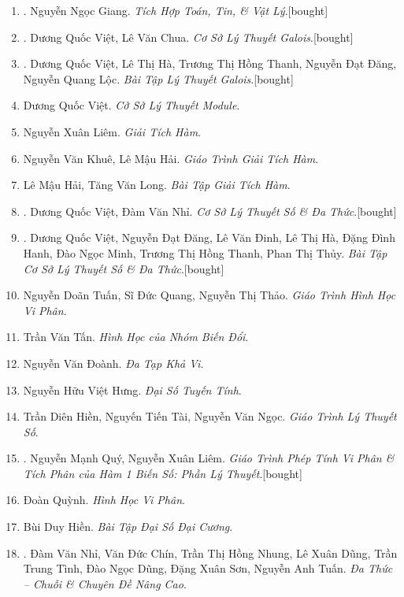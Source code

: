 \documentclass{article}
\begin{document}
\begin{enumerate}
	\item \cite{Giang2019}. Nguyễn Ngọc Giang. \textit{Tích Hợp Toán, Tin, \& Vật Lý}.\hfill\textsf{[bought]}
	\item \cite{Viet_Chua2022}. Dương Quốc Việt, Lê Văn Chua. \textit{Cơ Sở Lý Thuyết Galois}.\hfill\textsf{[bought]}
	\item \cite{Viet_Ha_Thanh_Dang_Loc2022}. Dương Quốc Việt, Lê Thị Hà, Trương Thị Hồng Thanh, Nguyễn Đạt Đăng, Nguyễn Quang Lộc. \textit{Bài Tập Lý Thuyết Galois}.\hfill\textsf{[bought]}
	\item Dương Quốc Việt. \textit{Cở Sở Lý Thuyết Module}.
	\item Nguyễn Xuân Liêm. \textit{Giải Tích Hàm}.
	\item Nguyễn Văn Khuê, Lê Mậu Hải. \textit{Giáo Trình Giải Tích Hàm}.
	\item Lê Mậu Hải, Tăng Văn Long. \textit{Bài Tập Giải Tích Hàm}.
	\item \cite{Viet_Nhi2022}. Dương Quốc Việt, Đàm Văn Nhỉ. \textit{Cơ Sở Lý Thuyết Số \& Đa Thức}.\hfill\textsf{[bought]}
	\item \cite{Viet_Dang_Dinh_Ha_Hanh_Minh_Thanh_Thuy2022}. Dương Quốc Việt, Nguyễn Đạt Đăng, Lê Văn Đinh, Lê Thị Hà, Đặng Đình Hanh, Đào Ngọc Minh, Trương Thị Hồng Thanh, Phan Thị Thủy. \textit{Bài Tập Cơ Sở Lý Thuyết Số \& Đa Thức}.\hfill\textsf{[bought]}
	\item Nguyễn Doãn Tuấn, Sĩ Đức Quang, Nguyễn Thị Thảo. \textit{Giáo Trình Hình Học Vi Phân}.
	\item Trần Văn Tấn. \textit{Hình Học của Nhóm Biến Đổi}.
	\item Nguyễn Văn Đoành. \textit{Đa Tạp Khả Vi}.
	\item Nguyễn Hữu Việt Hưng. \textit{Đại Số Tuyến Tính}.
	\item Trần Diên Hiền, Nguyến Tiến Tài, Nguyễn Văn Ngọc. \textit{Giáo Trình Lý Thuyết Số}.
	\item \cite{Quy_Liem2012}. Nguyễn Mạnh Quý, Nguyễn Xuân Liêm. \textit{Giáo Trình Phép Tính Vi Phân \& Tích Phân của Hàm 1 Biến Số: Phần Lý Thuyết}.\hfill\textsf{[bought]}
	\item Đoàn Quỳnh. \textit{Hình Học Vi Phân}.
	\item Bùi Duy Hiền. \textit{Bài Tập Đại Số Đại Cương}.
	\item \cite{Nhi_Chin_Dung_Dung_Tinh_Dung_Son_Tuan2017}. Đàm Văn Nhỉ, Văn Đức Chín, Trần Thị Hồng Nhung, Lê Xuân Dũng, Trần Trung Tình, Đào Ngọc Dũng, Đặng Xuân Sơn, Nguyễn Anh Tuấn. \textit{Đa Thức -- Chuỗi \& Chuyên Đề Nâng Cao}.

\end{enumerate}
\end{document}
